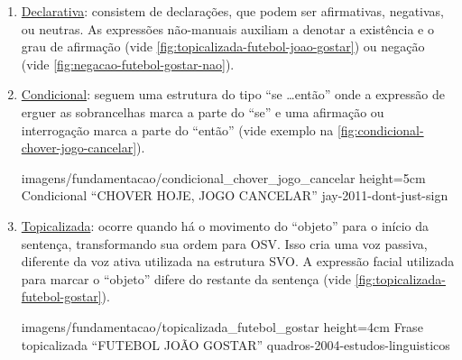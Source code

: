 \begin{enumerate}
\begin{enumerate}
        \item \underline{Declarativa}: consistem de declarações, que podem ser afirmativas, negativas, ou neutras. As expressões não-manuais auxiliam a denotar a existência e o grau de afirmação (vide \autoref{fig:topicalizada-futebol-joao-gostar}) ou negação (vide \autoref{fig:negacao-futebol-gostar-nao}).



        \item \underline{Condicional}: seguem uma estrutura do tipo ``se \dots então'' onde a expressão de erguer as sobrancelhas marca a parte do ``se'' e uma afirmação ou interrogação marca a parte do ``então'' (vide exemplo na \autoref{fig:condicional-chover-jogo-cancelar}).
        
            {imagens/fundamentacao/condicional_chover_jogo_cancelar} %
            {height=5cm} %
            {Condicional ``CHOVER HOJE, JOGO CANCELAR''} %
            {jay-2011-dont-just-sign} %

        \item \underline{Topicalizada}: ocorre quando há o movimento do ``objeto'' para o início da sentença, transformando sua ordem para OSV. Isso cria uma voz passiva, diferente da voz ativa utilizada na estrutura SVO.
        A expressão facial utilizada para marcar o ``objeto'' difere do restante da sentença (vide \autoref{fig:topicalizada-futebol-gostar}).
        
            {imagens/fundamentacao/topicalizada_futebol_gostar} %
            {height=4cm} %
            {Frase topicalizada ``FUTEBOL JOÃO GOSTAR''} %
            {quadros-2004-estudos-linguisticos} %




\end{enumerate}
\end{enumerate}
